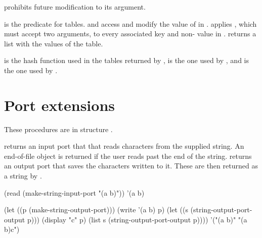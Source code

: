 prohibits future modification to its argument.

\begin{protos}
\end{protos}
\noindent
{} is the predicate for tables.
 and  access and modify the value of 
 in .
 applies , which must accept two arguments,
 to every associated key and non- value in .
 returns a list with the values of
the table.

\begin{protos}
\end{protos}
\noindent
{} is the hash function used in the tables
 returned by ,  is the one used
 by , and  is the one used
 by .

\section{Port extensions}

These procedures are in structure .

\begin{protos}
\end{protos}
\noindent {} returns an input port that
 that reads characters from the supplied string.  An end-of-file
 object is returned if the user reads past the end of the string.
 returns an output port that saves
 the characters written to it.
These are then returned as a string by .

\begin{example}
(read (make-string-input-port "(a b)"))
    \evalsto '(a b)

(let ((p (make-string-output-port)))
  (write '(a b) p)
  (let ((s (string-output-port-output p)))
    (display "c" p)
    (list s (string-output-port-output p))))
    \evalsto '("(a b)" "(a b)c")
\end{example}

